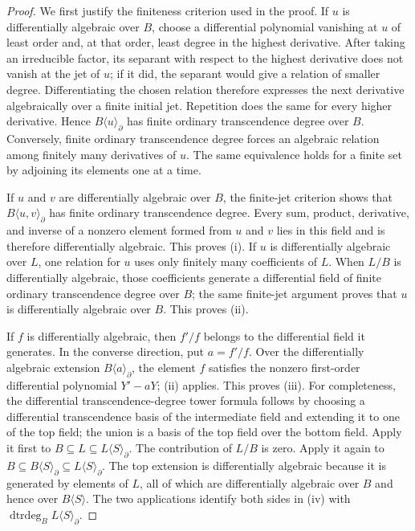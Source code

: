 \documentclass[11pt]{article}
\numberwithin{equation}{section}
\theoremstyle{definition}
\theoremstyle{remark}
\newcommand{\dtrdeg}{\operatorname{dtrdeg}}
\begin{document}
\begin{proof}
We first justify the finiteness criterion used in the proof.  If $u$ is
differentially algebraic over $B$, choose a differential polynomial
vanishing at $u$ of least order and, at that order, least degree in the
highest derivative.  After taking an irreducible factor, its separant with
respect to the highest derivative does not vanish at the jet of $u$; if it
did, the separant would give a relation of smaller degree.  Differentiating
the chosen relation therefore expresses the next derivative algebraically
over a finite initial jet.  Repetition does the same for every higher
derivative.  Hence $B\langle u\rangle_\partial$ has finite ordinary
transcendence degree over $B$.  Conversely, finite ordinary transcendence
degree forces an algebraic relation among finitely many derivatives of $u$.
The same equivalence holds for a finite set by adjoining its elements one at
a time.

If $u$ and $v$ are differentially algebraic over $B$, the finite-jet
criterion shows that $B\langle u,v\rangle_\partial$ has finite ordinary
transcendence degree.  Every sum, product, derivative, and inverse of a
nonzero element formed from $u$ and $v$ lies in this field and is therefore
differentially algebraic.  This proves (i).  If $u$ is differentially
algebraic over $L$, one relation for $u$ uses only finitely many coefficients
of $L$.  When $L/B$ is differentially algebraic, those coefficients generate
a differential field of finite ordinary transcendence degree over $B$; the
same finite-jet argument proves that $u$ is differentially algebraic over
$B$.  This proves (ii).

If $f$ is differentially
algebraic, then $f'/f$ belongs to the differential field it generates.  In
the converse direction, put $a=f'/f$.  Over the differentially algebraic
extension $B\langle a\rangle_\partial$, the element $f$ satisfies the
nonzero first-order differential polynomial $Y'-aY$; (ii) applies.  This
proves (iii).  For completeness, the differential transcendence-degree
tower formula follows by choosing a differential transcendence basis of the
intermediate field and extending it to one of the top field; the union is a
basis of the top field over the bottom field.  Apply it first to
$B\subseteq L\subseteq L\langle S\rangle_\partial$.  The contribution of
$L/B$ is zero.  Apply it again to
$B\subseteq B\langle S\rangle_\partial\subseteq
L\langle S\rangle_\partial$.  The top extension is differentially
algebraic because it is generated by elements of $L$, all of which are
differentially algebraic over $B$ and hence over $B\langle S\rangle$.
The two applications identify both sides in (iv) with
$\dtrdeg_B L\langle S\rangle_\partial$.
\end{proof}
\end{document}
